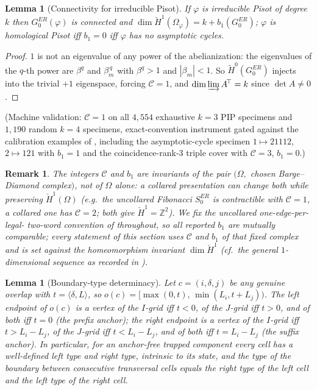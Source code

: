 \documentclass[11pt]{article}
\newtheorem{lemma}[theorem]{Lemma}
\newtheorem{remark}[theorem]{Remark}
\begin{document}
\begin{lemma}[Connectivity for irreducible Pisot]\label{lem:connect}
If $\varphi$ is irreducible Pisot of degree $k$ then $G_0^{ER}(\varphi)$
is connected and $\dim\check H^1(\Omega_\varphi)=k+b_1(G_0^{ER})$;
$\varphi$ is homological Pisot iff $b_1=0$ iff $\varphi$ has no
asymptotic cycles.
\end{lemma}

\begin{proof}
$1$ is not an eigenvalue of any power of the abelianization: the
eigenvalues of the $q$-th power are $\beta^q$ and $\beta_m^{\,q}$ with
$\beta^q>1$ and $|\beta_m|<1$. So $\widetilde H^0(G_0^{ER})$ injects
into the trivial $+1$ eigenspace, forcing $\mathcal C=1$, and
$\dim\varinjlim A^{\!\top}=k$ since $\det A\ne 0$.
\end{proof}

(Machine validation: $\mathcal C=1$ on all $4{,}554$ exhaustive $k=3$
PIP specimens and $1{,}190$ random $k=4$ specimens, exact-convention
instrument gated against the calibration examples of \cite{BBJS12},
including the asymptotic-cycle specimen $1\mapsto 21112$, $2\mapsto
121$ with $b_1=1$ and the coincidence-rank-$3$ triple cover with
$\mathcal C=3$, $b_1=0$.)

\begin{remark}\label{rem:convention}
The integers $\mathcal C$ and $b_1$ are invariants of the pair
$(\Omega,$ chosen Barge--Diamond complex$)$, not of $\Omega$ alone: a
collared presentation can change both while preserving $\check
H^1(\Omega)$ (e.g.\ the uncollared Fibonacci $S_0^{ER}$ is contractible
with $\mathcal C=1$, a collared one has $\mathcal C=2$; both give
$\check H^1=\mathbb Z^2$). We fix the uncollared one-edge-per-legal-
two-word convention of \cite{BD08,BBJS12} throughout, so all reported
$b_1$ are mutually comparable; every statement of this section uses
$\mathcal C$ and $b_1$ of that fixed complex and is set against the
homeomorphism invariant $\dim\check H^1$ (cf.\ the general
$1$-dimensional sequence as recorded in \cite{Sa14}).
\end{remark}

\begin{lemma}[Boundary-type determinacy]\label{lem:typedet}
Let $c=(i,\delta,j)$ be any genuine overlap with $t=\langle\delta,
L\rangle$, so $o(c)=[\max(0,t),\,\min(L_i,t+L_j))$. The left endpoint
of $o(c)$ is a vertex of the $I$-grid iff $t<0$, of the $J$-grid iff
$t>0$, and of both iff $t=0$ (the prefix anchor); the right endpoint
is a vertex of the $I$-grid iff $t>L_i-L_j$, of the $J$-grid iff
$t<L_i-L_j$, and of both iff $t=L_i-L_j$ (the suffix anchor). In
particular, for an anchor-free trapped component every cell has a
well-defined left type and right type, intrinsic to its state, and the
type of the boundary between consecutive transversal cells equals the
right type of the left cell and the left type of the right cell.
\end{lemma}
\end{document}
